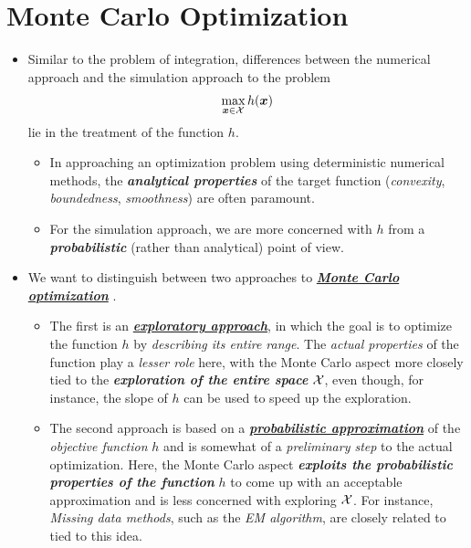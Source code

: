 \documentclass[11pt]{article}
\begin{document}
\section{Monte Carlo Optimization}
\begin{itemize}
\item Similar to the problem of integration, differences between the numerical approach and the simulation approach to the problem
\begin{align}
\max_{\boldsymbol{x}\in {\mathcal X}} h(\boldsymbol{x}) \label{eqn: stochastic_opt}
\end{align} lie in the treatment of the function $h$. 
\begin{itemize}
\item In approaching an optimization problem using deterministic numerical methods, the \emph{\textbf{analytical properties}} of the target function (\emph{convexity}, \emph{boundedness}, \emph{smoothness}) are often paramount.
\item For the simulation approach, we are more concerned with $h$ from a \emph{\textbf{probabilistic}} (rather than analytical) point of view. 
\end{itemize}

\item We want to distinguish between two approaches to \underline{\emph{\textbf{Monte Carlo optimization}}} \citep{robert1999monte}.
\begin{itemize}
\item  The first is an \underline{\emph{\textbf{exploratory approach}}}, in which the goal is to optimize the function $h$ by \emph{describing its entire range}. The \emph{actual properties} of the function play a \emph{lesser role} here, with the Monte Carlo aspect more closely tied to the \emph{\textbf{exploration of the entire space}} ${\mathcal X}$, even though, for instance, the slope of $h$ can be used to speed up the exploration.

\item The second approach is based on a \underline{\emph{\textbf{probabilistic approximation}}} of the \emph{objective function} $h$ and is somewhat of a \emph{preliminary step} to the actual optimization. Here, the Monte Carlo aspect \emph{\textbf{exploits the probabilistic properties of the function}} $h$ to come up with an acceptable approximation and is less concerned with exploring ${\mathcal X}$. For instance, \emph{Missing data methods}, such as the \emph{EM algorithm}, are closely related to tied to this idea.
\end{itemize}

\end{itemize}
\end{document}
